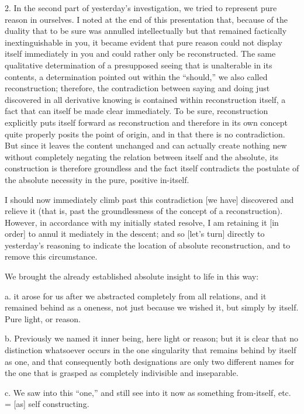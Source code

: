 2. In the second part of yesterday's investigation,
we tried to represent pure reason in ourselves.
I noted at the end of this presentation that,
because of the duality that to be sure was annulled intellectually
but that remained factically inextinguishable in you,
it became evident that pure reason could not
display itself immediately in you
and could rather only be reconstructed.
The same qualitative determination of
a presupposed seeing that is unalterable in its contents,
a determination pointed out within the “should,”
we also called reconstruction;
therefore, the contradiction between saying and doing
just discovered in all derivative knowing is
contained within reconstruction itself,
a fact that can itself be made clear immediately.
To be sure, reconstruction explicitly puts
itself forward as reconstruction
and therefore in its own concept
quite properly posits the point of origin,
and in that there is no contradiction.
But since it leaves the content unchanged
and can actually create nothing new
without completely negating the relation
between itself and the absolute,
its construction is therefore groundless
and the fact itself contradicts the postulate
of the absolute necessity in
the pure, positive in-itself.

I should now immediately climb past this
contradiction [we have] discovered and relieve it
(that is, past the groundlessness of
the concept of a reconstruction).
However, in accordance with my initially stated resolve,
I am retaining it [in order] to annul it mediately in the descent;
and so [let's turn] directly to yesterday's reasoning
to indicate the location of absolute reconstruction,
and to remove this circumstance.

We brought the already established absolute insight
to life in this way:

a. it arose for us after
we abstracted completely from all relations,
and it remained behind as a oneness,
not just because we wished it,
but simply by itself.
Pure light, or reason.

b. Previously we named it inner being,
here light or reason;
but it is clear that no distinction whatsoever occurs
in the one singularity that remains behind by itself as one,
and that consequently both designations are only
two different names for the one
that is grasped as completely
indivisible and inseparable.

c. We saw into this “one,”
and still see into it now as
something from-itself,
etc. = [as] self constructing.

